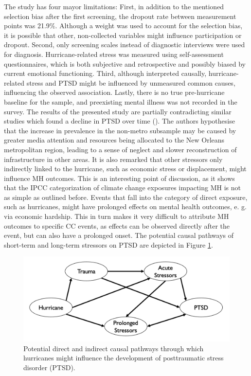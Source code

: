 \documentclass[
]{krantz}
\begin{document}
The study has four mayor limitations: First, in addition to the mentioned selection bias after the first screening, the dropout rate between measurement points was 21.9\%. Although a weight was used to account for the selection bias, it is possible that other, non-collected variables might influence participation or dropout. Second, only screening scales instead of diagnostic interviews were used for diagnosis. Hurricane-related stress was measured using self-assessment questionnaires, which is both subjective and retrospective and possibly biased by current emotional functioning. Third, although interpreted causally, hurricane-related stress and PTSD might be influenced by unmeasured common causes, influencing the observed association. Lastly, there is no true pre-hurricane baseline for the sample, and preexisting mental illness was not recorded in the survey.
The results of the presented study are partially contradicting similar studies which found a decline in PTSD over time (\citet{chen2015}). The authors hypothesise that the increase in prevalence in the non-metro subsample may be caused by greater media attention and resources being allocated to the New Orleans metropolitan region, leading to a sense of neglect and slower reconstruction of infrastructure in other areas. It is also remarked that other stressors only indirectly linked to the hurricane, such as economic stress or displacement, might influence MH outcomes. This is an interesting point of discussion, as it shows that the IPCC categorization of climate change exposures impacting MH is not as simple as outlined before. Events that fall into the category of direct exposure, such as hurricanes, might have prolonged effects on mental health outcomes, e. g. via economic hardship. This in turn makes it very difficult to attribute MH outcomes to specific CC events, as effects can be observed directly after the event, but can also have a prolonged onset. The potential causal pathways of short-term and long-term stressors on PTSD are depicted in Figure \ref{fig:DAGHurricane}.

\begin{figure}

{\centering \includegraphics[width=0.75\linewidth]{work/12-mentalhealth/figures/DAG_hurricane} 

}

\caption{Potential direct and indirect causal pathways through which hurricanes might influence the development of posttraumatic stress disorder (PTSD).}\label{fig:DAGHurricane}
\end{figure}
\end{document}
